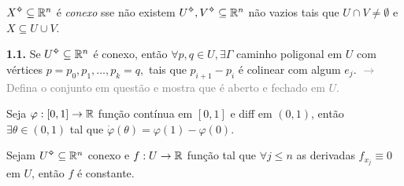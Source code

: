 \begin{definition}
\(X\ab\subseteq \R^n\) é \emph{conexo} sse não existem \( U\ab,V\ab\subseteq \R^n\) não vazios tais que \(U\cap V \neq \emptyset\) e \(X \subseteq U\cup V\). 
\end{definition}

\Ei

\hypertarget{lemma11}{}
\begin{lemma}
  \textbf{1.1.} Se \(U\ab\subseteq \R^n\) é conexo, então \(\forall p,q\in U, \exists \Gamma\) caminho poligonal em \(U\) com vértices \(p = p_0, p_1, \ldots, p_k = q,\) tais que \(p_{i+1}- p_i\) é colinear com algum \(e_j\). 
  \textcolor{gray}{\(\rightarrow \) Defina o conjunto em questão e mostra que é aberto e fechado em \(U\).}
\end{lemma}

\hypertarget{thmTVMR}{}
\begin{theorem}
  Seja \(\varphi: [0,1] \to \mathbb{R}\) função contínua em \([0,1]\) e diff em \((0,1)\), então \(\exists \theta \in (0,1)\) tal que \(\dot{\varphi}(\theta) = \varphi(1) - \varphi(0)\). 
\end{theorem}
\begin{proposition}
  Sejam \(U\ab\subseteq \R^n\) conexo e \(f:U\to \mathbb{R}\) função tal que \(\forall j\leq n\) as derivadas \(f_{x_j}\equiv 0\) em \(U\), então \(f\) é constante. 
\end{proposition}


